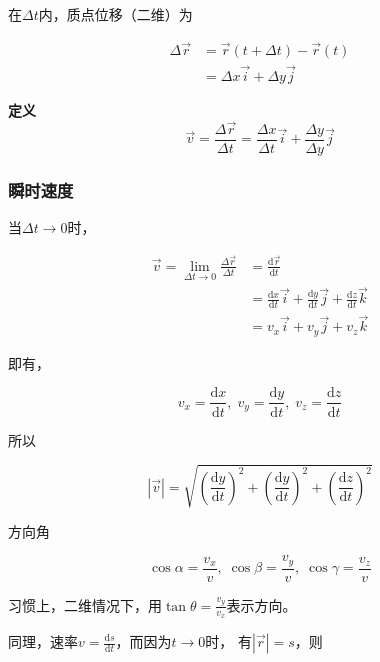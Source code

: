 \documentclass[12pt, a4paper]{article}
\newcommand{\rmd}{\mathrm{d}}
\begin{document}
    在\(\Delta t\)内，质点位移（二维）为

    \begin{align*}
        \Delta \overrightarrow{r} &= \overrightarrow{r} \left(t + \Delta t\right) -
        \overrightarrow{r} \left(t\right)
        \\
        &= \Delta x \overrightarrow{i} + \Delta y \overrightarrow{j}
    \end{align*}

    \textbf{定义}
    \[
        \overrightarrow{v} = \frac{\Delta \overrightarrow{r}}{\Delta t} =
        \frac{\Delta x}{\Delta t} \overrightarrow{i} + \frac{\Delta y}{\Delta y} \overrightarrow{j}
    \]

\subsubsection{瞬时速度}

    当\(\Delta t \rightarrow 0\)时，

    \begin{align*}
        \overrightarrow{v} = \lim_{\Delta t \rightarrow 0}\frac{\Delta \overrightarrow{r}}{\Delta t}
        &= \frac{\rmd \overrightarrow{r}}{\rmd t}
        \\
        &= \frac{\rmd x}{\rmd t} \overrightarrow{i} + \frac{\rmd y}{\rmd t} \overrightarrow{j}
        + \frac{\rmd z}{\rmd t} \overrightarrow{k}
        \\
        & = v_{x} \overrightarrow{i} + v_{y} \overrightarrow{j} + v_{z} \overrightarrow{k}
    \end{align*}

    即有，

    \[
        v_{x} = \frac{\rmd x}{\rmd t},\; v_{y} = \frac{\rmd y}{\rmd t},\; v_{z} = \frac{\rmd z}{\rmd t}
    \]

    所以

    \[
        \left|\overrightarrow{v} \right| = \sqrt{\left(\frac{\rmd y}{\rmd t}\right)^2 +
        \left(\frac{\rmd y}{\rmd t}\right)^2 + \left(\frac{\rmd z}{\rmd t}\right)^2}
    \]

    方向角

    \[
        \cos \alpha = \frac{v_x}{v},\; \cos \beta = \frac{v_y}{v}, \;\cos \gamma = \frac{v_z}{v}
    \]

    习惯上，二维情况下，用\(\tan \theta = \frac{v_y}{v_x}\)表示方向。

    同理，速率\(v = \frac{\rmd s}{\rmd t}\)，而因为\(t \rightarrow 0\)时，
    有\(\left|\overrightarrow{r}\right| = s\)，则
\end{document}

